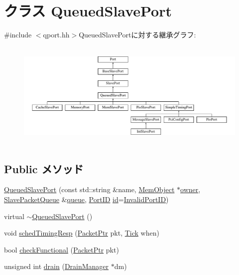 \hypertarget{classQueuedSlavePort}{
\section{クラス QueuedSlavePort}
\label{classQueuedSlavePort}
}


{\ttfamily \#include $<$qport.hh$>$}QueuedSlavePortに対する継承グラフ:\begin{figure}[H]
\begin{center}
\leavevmode
\includegraphics[height=5.18519cm]{classQueuedSlavePort}
\end{center}
\end{figure}
\subsection*{Public メソッド}
\begin{DoxyCompactItemize}
\item 
\hyperlink{classQueuedSlavePort_a150e71ad6ae4ad6eb65adc52ca8ff294}{QueuedSlavePort} (const std::string \&name, \hyperlink{classMemObject}{MemObject} $\ast$\hyperlink{classPort_aba966efb6c1df4b015be3a396df6c318}{owner}, \hyperlink{classSlavePacketQueue}{SlavePacketQueue} \&\hyperlink{classQueuedSlavePort_a89fcdbe2ab63d24f2112bc7e05bf2413}{queue}, \hyperlink{base_2types_8hh_acef4d7d41cb21fdc252e20c04cd7bb8e}{PortID} \hyperlink{classPort_a0a67444fc1c33a60fe4a92bfff05d0cb}{id}=\hyperlink{base_2types_8hh_a65bf40f138cf863f0c5e2d8ca1144126}{InvalidPortID})
\item 
virtual \hyperlink{classQueuedSlavePort_a15b90c8a70a02ac8423cf5cd5b24bbb4}{$\sim$QueuedSlavePort} ()
\item 
void \hyperlink{classQueuedSlavePort_a31c2fe79e7cbd7319eb327074e412675}{schedTimingResp} (\hyperlink{classPacket}{PacketPtr} pkt, \hyperlink{base_2types_8hh_a5c8ed81b7d238c9083e1037ba6d61643}{Tick} when)
\item 
bool \hyperlink{classQueuedSlavePort_a8eb60d4744b6212ad749f3a586759266}{checkFunctional} (\hyperlink{classPacket}{PacketPtr} pkt)
\item 
unsigned int \hyperlink{classQueuedSlavePort_aa8a18d230dba7a674ac8a0b4f35bc36a}{drain} (\hyperlink{classDrainManager}{DrainManager} $\ast$dm)
\end{DoxyCompactItemize}
